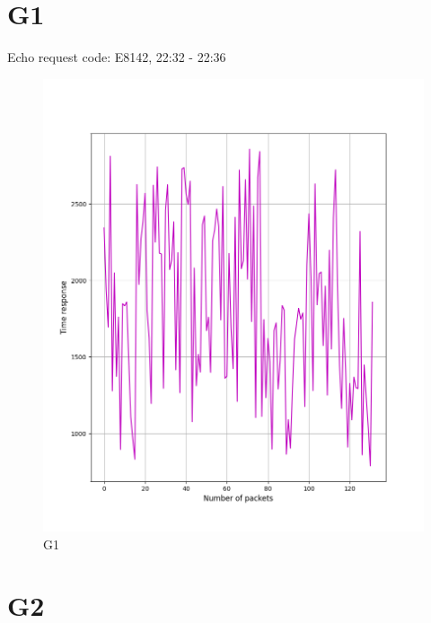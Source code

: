 \documentclass[hidelinks, 12pt, a4paper]{article}
\begin{document}



\pagebreak
\tableofcontents
\pagebreak



\section{G1}

Echo request code: E8142, 22:32 - 22:36

\begin{figure}[h!]
\centering
	\includegraphics[height=.5\textheight, width=\textwidth]{assets/session1/g1.png}
	\caption{G1} 
\end{figure}

\section{G2}
\end{document}
